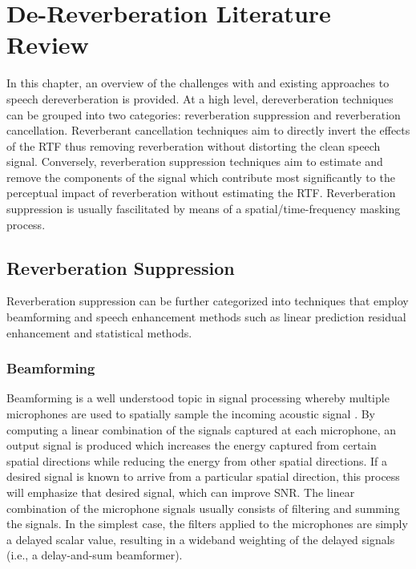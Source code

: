 \chapter{De-Reverberation Literature Review}

In this chapter, an overview of the challenges with and existing approaches to speech dereverberation is provided. At a high level, dereverberation techniques can be grouped into two categories: reverberation suppression and reverberation cancellation. Reverberant cancellation techniques aim to directly invert the effects of the RTF thus removing reverberation without distorting the clean speech signal. Conversely, reverberation suppression techniques aim to estimate and remove the components of the signal which contribute most significantly to the perceptual impact of reverberation without estimating the RTF. Reverberation suppression is usually fascilitated by means of a spatial/time-frequency masking process.



\section{Reverberation Suppression}

Reverberation suppression can be further categorized into techniques that employ beamforming and speech enhancement methods such as linear prediction residual enhancement and statistical methods.

\subsection{Beamforming}

Beamforming is a well understood topic in signal processing whereby multiple microphones are used to spatially sample the incoming acoustic signal \citep{elko1996microphone, van1988beamforming, flanagan1985computer}. By computing a linear combination of the signals captured at each microphone, an output signal is produced which increases the energy captured from certain spatial directions while reducing the energy from other spatial directions. If a desired signal is known to arrive from a particular spatial direction, this process will emphasize that desired signal, which can improve SNR. The linear combination of the microphone signals usually consists of filtering and summing the signals. In the simplest case, the filters applied to the microphones are simply a delayed scalar value, resulting in a wideband weighting of the delayed signals (i.e., a delay-and-sum beamformer). 

